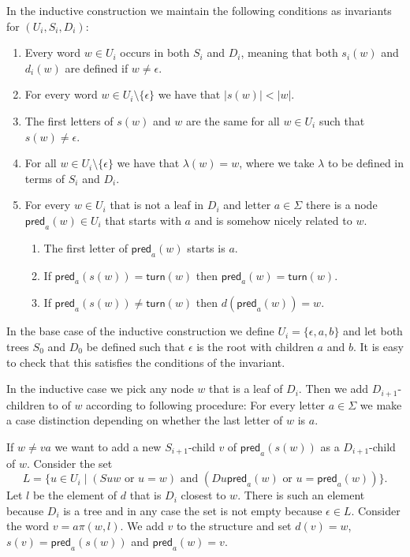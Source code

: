 \documentclass[a4paper]{article}
\begin{document}
\newcommand{\pred}{\mathsf{pred}}

In the inductive construction we maintain the following conditions as
invariants for $(U_i,S_i,D_i)$:
\begin{enumerate}
 \item Every word $w \in U_i$ occurs in both $S_i$ and $D_i$, meaning
that both $s_i(w)$ and $d_i(w)$ are defined if $w \neq \epsilon$.
 \item For every word $w \in U_i \setminus \{\epsilon\}$ we have that
$|s(w)| < |w|$.
 \item The first letters of $s(w)$ and $w$ are the same for all $w \in
U_i$ such that $s(w) \neq \epsilon$.
 \item For all $w \in U_i \setminus \{\epsilon\}$ we have that
$\lambda(w) = w$, where we take $\lambda$ to be defined in terms of
$S_i$ and $D_i$.
 \item For every $w \in U_i$ that is not a leaf in $D_i$ and letter $a
\in \Sigma$ there is a node $\pred_a(w) \in U_i$ that starts
with $a$ and is somehow nicely related to $w$.
\begin{enumerate}
 \item The first letter of $\pred_a(w)$ starts is $a$.
 \item If $\pred_a(s(w)) = \mathsf{turn}(w)$ then $\pred_a(w) =
\mathsf{turn}(w)$.
 \item If $\pred_a(s(w)) \neq \mathsf{turn}(w)$ then $d(\pred_a(w)) = w$.
\end{enumerate}
\end{enumerate}

In the base case of the inductive construction we define $U_i =
\{\epsilon, a, b\}$ and let both trees $S_0$ and $D_0$ be defined such
that $\epsilon$ is the root with children $a$ and $b$. It is easy to
check that this satisfies the conditions of the invariant.

In the inductive case we pick any node $w$ that is a leaf of $D_i$. Then
we add $D_{i + 1}$-children to of $w$ according to following procedure:
For every letter $a \in \Sigma$ we make a case distinction depending on
whether the last letter of $w$ is $a$.

\medskip

If $w \neq va$ we want to add a new $S_{i + 1}$-child $v$ of
$\pred_a(s(w))$ as a $D_{i + 1}$-child of $w$. Consider the set
\[
 L = \{u \in U_i \mid (S u w \mbox{ or } u = w) \mbox{ and } (D u
\pred_a(w) \mbox{ or } u = \pred_a(w)) \}.
\]
Let $l$ be the element of $d$ that is $D_i$ closest to $w$. There is
such an element because $D_i$ is a tree and in any case the set is not
empty because $\epsilon \in L$. Consider the word $v = a \pi(w,l)$. We
add $v$ to the structure and set $d(v) = w$, $s(v) = \pred_a(s(w))$ and
$\pred_a(w) = v$.
\end{document}
